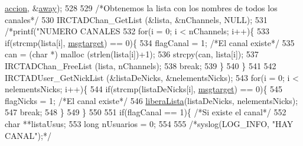 \begin{DoxyCode}
{{{{{{{{{      \hyperlink{_g-2361-06-_p1-_server_8c_a93e785c991445d8b8ee99c2e51242d5a}{accion}, &\hyperlink{_g-2361-06-_p1-_server_8c_adf86742e21384f58f8999d8317e6a370}{away});
528 
529                                 \textcolor{comment}{/*Obtenemos la lista con los nombres de todos los canales*/}
530                                 IRCTADChan\_GetList (&lista, &nChannels, NULL);
531                                 \textcolor{comment}{/*printf("NUMERO CANALES %
532                                 \textcolor{keywordflow}{for}(i = 0; i < nChannels; i++)\{
533                                         \textcolor{keywordflow}{if}(strcmp(lista[i], \hyperlink{_g-2361-06-_p1-_server_8c_a968dcc7e43caeca7959f3c069dcccc6a}{msgtarget}) == 0)\{
534                                                 flagCanal = 1; \textcolor{comment}{/*El canal existe*/}
535                                                 can = (\textcolor{keywordtype}{char} *) malloc (strlen(lista[i])+1);
536                                                 strcpy(can, lista[i]);
537                                                 IRCTADChan\_FreeList (lista, nChannels);
538                                                 \textcolor{keywordflow}{break};
539                                         \}
540                                 \}
541                                 
542                                 IRCTADUser\_GetNickList (&listaDeNicks, &nelementsNicks);
543                                 \textcolor{keywordflow}{for}(i = 0; i < nelementsNicks; i++)\{
544                                         \textcolor{keywordflow}{if}(strcmp(listaDeNicks[i], \hyperlink{_g-2361-06-_p1-_server_8c_a968dcc7e43caeca7959f3c069dcccc6a}{msgtarget}) == 0)\{
545                                                 flagNicks = 1; \textcolor{comment}{/*El canal existe*/}
546                                                 \hyperlink{_g-2361-06-_p1-_functions_8h_a5fa63429b3483f20a469c23625c96820}{liberaLista}(listaDeNicks, nelementsNicks);
547                                                 \textcolor{keywordflow}{break};
548                                         \}
549                                 \}
550                                 
551                                 \textcolor{keywordflow}{if}(flagCanal == 1)\{ \textcolor{comment}{/*Si existe el canal*/}
552                                         \textcolor{keywordtype}{char} **listaUsus;
553                                         \textcolor{keywordtype}{long} nUsuarios = 0;
554 
555                                         \textcolor{comment}{/*syslog(LOG\_INFO, "HAY CANAL");*/}
}}}}}}}}}}
\end{DoxyCode}
